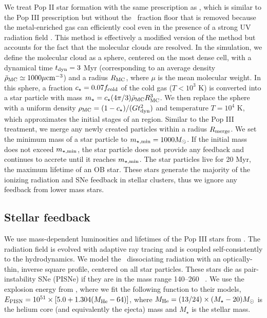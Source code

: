 \documentclass[apjl]{emulateapj}
\begin{document}
%

We treat Pop II star formation with the same prescription as
\citet{Wise09}, which is similar to the Pop III prescription but
without the \hh~fraction floor that is removed because the
metal-enriched gas can efficiently cool even in the presence of a
strong UV radiation field \citep[e.g.][]{Safranek10}.  This method is
effectively a modified version of the \citet{Cen92} method but
accounts for the fact that the molecular clouds are resolved.  In the
simulation, we define the molecular cloud as a sphere, centered on the
most dense cell, with a dynamical time $t_{\rm dyn} = 3$ Myr
(corresponding to an average density $\bar{\rho}_{\rm MC} \simeq
1000\mu \cubecm$) and a radius $R_{\rm MC}$, where $\mu$ is the mean
molecular weight.  In this sphere, a fraction $c_\star = 0.07 f_{\rm
  cold}$ of the cold gas ($T < 10^3$ K) is converted into a star
particle with mass $m_\star = c_\star (4\pi/3) \bar{\rho}_{\rm MC}
R_{\rm MC}^3$.  We then replace the sphere with a uniform density
$\rho_{\rm MC} = (1 - c_\star) / (Gt_{\rm dyn}^2)$ and temperature $T
= 10^4$ K, which approximates the initial stages of an 
region.  Similar to the Pop III treatment, we merge any newly created
particles within a radius $R_{\rm merge}$.  We set the minimum mass of
a star particle to $m_{\rm \star, min} = 1000 \Ms$.  If the initial
mass does not exceed $m_{\rm \star, min}$, the star particle does not
provide any feedback and continues to accrete until it reaches $m_{\rm
  \star, min}$.  The star particles live for 20 Myr, the maximum
lifetime of an OB star.  These stars generate the majority of the
ionizing radiation and SNe feedback in stellar clusters, thus we
ignore any feedback from lower mass stars.

\subsection{Stellar feedback}

We use mass-dependent luminosities and lifetimes of the Pop III stars
from \citet{Schaerer02}.  The radiation field is evolved with adaptive
ray tracing \citep{Abel02_RT, Wise11_Moray} and is coupled
self-consistently to the hydrodynamics.  We model the \hh~dissociating
radiation with an optically-thin, inverse square profile, centered on
all star particles.  These stars die as pair-instability SNe (PISNe)
if they are in the mass range 140--260 \Ms~\citep{Heger03}.  We use
the explosion energy from \citet{Heger02}, where we fit the following
function to their models, $E_{\rm PISN} = 10^{51} \times [5.0 + 1.304
  (M_{\rm He} - 64)]$, where $M_{\rm He} = (13/24) \times (M_\star -
20) \Ms$ is the helium core (and equivalently the ejecta) mass and
$M_\star$ is the stellar mass.
\end{document}
